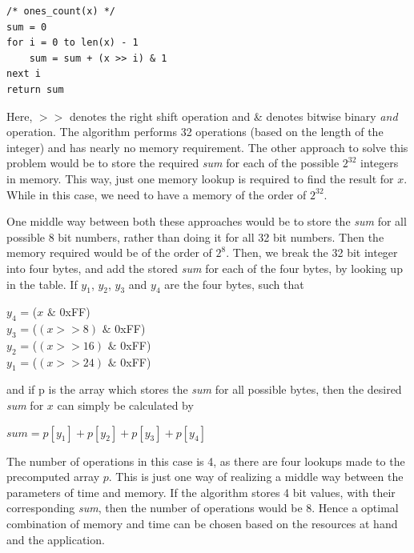 \begin{lstlisting}[frame=tb]
/* ones_count(x) */
sum = 0
for i = 0 to len(x) - 1
    sum = sum + (x >> i) & 1
next i
return sum
\end{lstlisting}

Here, $>>$ denotes the right shift operation and \& denotes bitwise binary \emph{and} operation. The algorithm performs 32 operations (based on the length of the integer) and has nearly no memory requirement. The other approach to solve this problem would be to store the required \emph{sum} for each of the possible $2^{32}$ integers in memory. This way, just one memory lookup is required to find the result for $x$. While in this case, we need to have a memory of the order of $2^{32}$. 

One middle way between both these approaches would be to store the \textit{sum} for all possible 8 bit numbers, rather than doing it for all 32 bit numbers. Then the memory required would be of the order of $2^{8}$. Then, we break the 32 bit integer into four bytes, and add the stored \textit{sum} for each of the four bytes, by looking up in the table. If $y_1$, $y_2$, $y_3$ and $y_4$ are the four bytes, such that


\begin{center}
$y_4$ = ($x$ $\&$ $0$xFF)\\
$y_3$ = ($(x >> 8)$ $\&$ $0$xFF)\\ 
$y_2$ = ($(x >> 16)$ $\&$ $0$xFF)\\ 
$y_1$ = ($(x >> 24)$ $\&$ $0$xFF)\\
\end{center}

and if p is the array which stores the \textit{sum} for all possible bytes, then the desired \textit{sum} for $x$ can simply be calculated by

\begin{center}
\large{$sum = p[y_1] + p[y_2] + p[y_3] + p[y_4]$}\\
\end{center}

The number of operations in this case is 4, as there are four lookups made to the precomputed array $p$. This is just one way of realizing a middle way between the parameters of time and memory. If the algorithm stores 4 bit values, with their corresponding \textit{sum}, then the number of operations would be 8. Hence a optimal combination of memory and time can be chosen based on the resources at hand and the application. 



